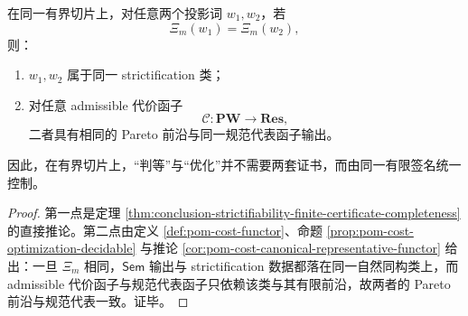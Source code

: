 \begin{corollary}[判等与优化的同一有限签名原则]\label{cor:conclusion-finite-signature-unifies-equivalence-and-optimization}
在同一有界切片上，对任意两个投影词 \(w_1,w_2\)，若
\[
\Xi_m(w_1)=\Xi_m(w_2),
\]
则：
\begin{enumerate}
  \item \(w_1,w_2\) 属于同一 strictification 类；
  \item 对任意 admissible 代价函子
  \[
  \mathcal C:\mathbf{PW}\to\mathbf{Res},
  \]
  二者具有相同的 Pareto 前沿与同一规范代表函子输出。
\end{enumerate}
因此，在有界切片上，“判等”与“优化”并不需要两套证书，而由同一有限签名统一控制。
\end{corollary}
\begin{proof}
第一点是定理 \ref{thm:conclusion-strictifiability-finite-certificate-completeness} 的直接推论。第二点由定义 \ref{def:pom-cost-functor}、命题 \ref{prop:pom-cost-optimization-decidable} 与推论 \ref{cor:pom-cost-canonical-representative-functor} 给出：一旦 \(\Xi_m\) 相同，\(\mathsf{Sem}\) 输出与 strictification 数据都落在同一自然同构类上，而 admissible 代价函子与规范代表函子只依赖该类与其有限前沿，故两者的 Pareto 前沿与规范代表一致。证毕。
\end{proof}

